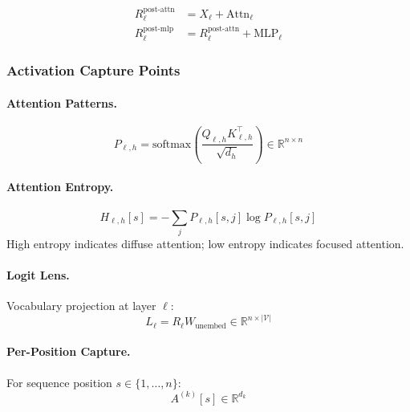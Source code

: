 \documentclass[11pt]{article}
\begin{document}
\begin{align}
R^{\text{post-attn}}_\ell &= X_\ell + \text{Attn}_\ell \\
R^{\text{post-mlp}}_\ell &= R^{\text{post-attn}}_\ell + \text{MLP}_\ell
\end{align}

\subsubsection{Activation Capture Points}
\label{sec:llm-activation-capture-points}

\paragraph{Attention Patterns.}
\begin{equation}
P_{\ell,h} = \text{softmax}\left(\frac{Q_{\ell,h} K_{\ell,h}^\top}{\sqrt{d_h}}\right) \in \mathbb{R}^{n \times n}
\end{equation}

\paragraph{Attention Entropy.}
\begin{equation}
H_{\ell,h}[s] = -\sum_j P_{\ell,h}[s, j] \log P_{\ell,h}[s, j]
\end{equation}
High entropy indicates diffuse attention; low entropy indicates focused attention.

\paragraph{Logit Lens.}
Vocabulary projection at layer $\ell$:
\begin{equation}
L_\ell = R_\ell W_{\text{unembed}} \in \mathbb{R}^{n \times |\mathcal{V}|}
\end{equation}

\paragraph{Per-Position Capture.}
For sequence position $s \in \{1, \ldots, n\}$:
\begin{equation}
A^{(k)}[s] \in \mathbb{R}^{d_k}
\end{equation}
\end{document}
